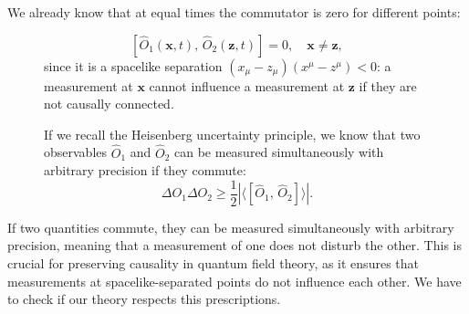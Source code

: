 We already know that at equal times the commutator is zero for different points:
\begin{figure}[H]
    \centering
    \begin{minipage}{0.5\textwidth}
        \centering
    \end{minipage}
    \hfill
    \begin{minipage}{0.45\textwidth}
        \[
            \left[\hat{O}_1(\mathbf{x}, t),\, \hat{O}_2(\mathbf{z}, t)\right] = 0, \quad \mathbf{x} \neq \mathbf{z},
        \]
        since it is a spacelike separation \((x_\mu - z_\mu)(x^{\mu}-z^{\mu}) < 0\): a measurement at \(\mathbf{x}\) cannot influence a measurement at \(\mathbf{z}\) if they are not causally connected.

        If we recall the Heisenberg uncertainty principle, we know that two observables \(\hat{O}_1\) and \(\hat{O}_2\) can be measured simultaneously with arbitrary precision if they commute:
        \[
            \Delta O_1 \Delta O_2 \geq \frac{1}{2} \left| \langle \left[\hat{O}_1,\, \hat{O}_2\right] \rangle \right|.
        \]
    \end{minipage}
\end{figure}
If two quantities commute, they can be measured simultaneously with arbitrary precision, meaning that a measurement of one does not disturb the other. This is crucial for preserving causality in quantum field theory, as it ensures that measurements at spacelike-separated points do not influence each other. We have to check if our theory respects this prescriptions.

